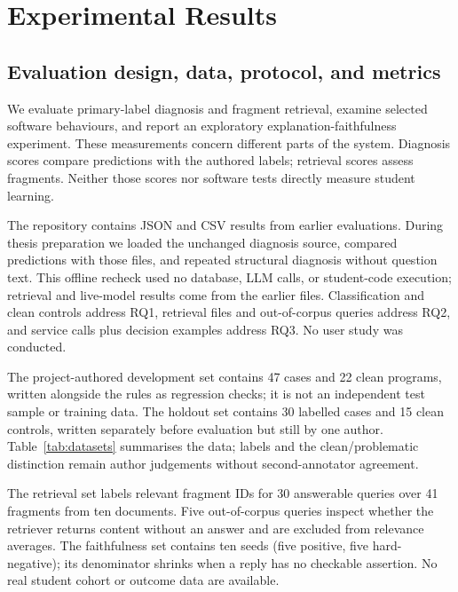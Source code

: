 \chapter{Experimental Results}
\label{ch:experiments}

\section{Evaluation design, data, protocol, and metrics}
We evaluate primary-label diagnosis and fragment retrieval, examine selected software behaviours, and report an exploratory explanation-faithfulness experiment. These measurements concern different parts of the system. Diagnosis scores compare predictions with the authored labels; retrieval scores assess fragments. Neither those scores nor software tests directly measure student learning.

The repository contains JSON and CSV results from earlier evaluations. During thesis preparation we loaded the unchanged diagnosis source, compared predictions with those files, and repeated structural diagnosis without question text. This offline recheck used no database, LLM calls, or student-code execution; retrieval and live-model results come from the earlier files. Classification and clean controls address RQ1, retrieval files and out-of-corpus queries address RQ2, and service calls plus decision examples address RQ3. No user study was conducted.

The project-authored development set contains 47 cases and 22 clean programs, written alongside the rules as regression checks; it is not an independent test sample or training data. The holdout set contains 30 labelled cases and 15 clean controls, written separately before evaluation but still by one author. Table~\ref{tab:datasets} summarises the data; labels and the clean/problematic distinction remain author judgements without second-annotator agreement.

The retrieval set labels relevant fragment IDs for 30 answerable queries over 41 fragments from ten documents. Five out-of-corpus queries inspect whether the retriever returns content without an answer and are excluded from relevance averages. The faithfulness set contains ten seeds (five positive, five hard-negative); its denominator shrinks when a reply has no checkable assertion. No real student cohort or outcome data are available.

